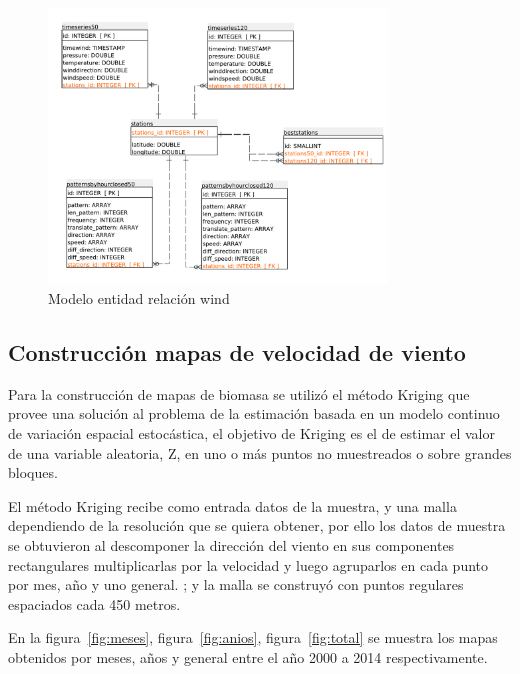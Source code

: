 \begin{figure}
  \centering
  \includegraphics[width = 9cm]{windET.pdf}
  \caption{Modelo entidad relación wind}
  \label{fig:windET}
\end{figure}





\subsection{Construcción mapas de velocidad de viento}

Para la construcción de mapas de biomasa se utilizó el método Kriging que provee una solución al problema 
de la estimación basada en un modelo continuo de variación espacial estocástica, el objetivo de Kriging es el de estimar el valor de una 
variable aleatoria, Z, en uno o más puntos no muestreados o sobre grandes bloques. 

El método Kriging recibe como entrada datos de la muestra, y una malla dependiendo de la resolución que se quiera obtener, por ello los datos de muestra se
obtuvieron al descomponer la dirección del viento en sus componentes rectangulares multiplicarlas por la velocidad y luego agruparlos en cada punto por mes, año y uno general.
; y la 
 malla se construyó con puntos regulares espaciados cada 450 metros. 
 
 En la figura~\ref{fig:meses}, figura~\ref{fig:anios}, figura~\ref{fig:total}  se muestra los mapas obtenidos por meses, años y general entre el año 2000 a 2014 respectivamente. 

